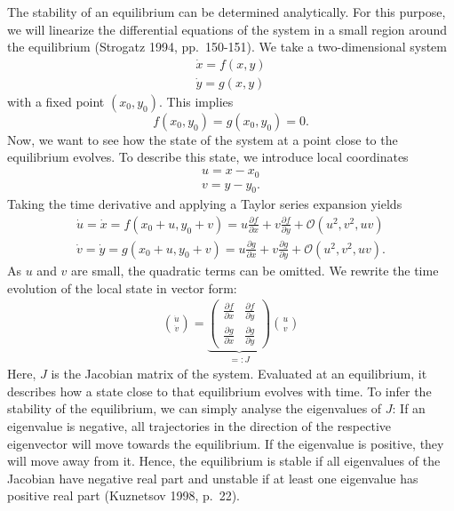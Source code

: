 \documentclass[12pt,a4paper,]{report}
\begin{document}
The stability of an equilibrium can be determined analytically. For this
purpose, we will linearize the differential equations of the system in a
small region around the equilibrium (Strogatz 1994, pp.~150-151). We
take a two-dimensional system
%
\begin{equation}
\label{stability-system}
\begin{split}
\dot{x} = f(x, y) \\
\dot{y} = g(x, y)
\end{split}
\end{equation}
%
 with a fixed point $(x_0, y_0)$. This implies
%
\begin{equation}
\label{stability-implication}
f(x_0, y_0) = g(x_0, y_0) = 0.
\end{equation}
%
 Now, we want to see how the state of the system at a point close to the
equilibrium evolves. To describe this state, we introduce local
coordinates
%
\begin{equation}
\label{stability-linearization}
\begin{split}
u = x - x_0 \\
v = y - y_0.
\end{split}
\end{equation}
%
 Taking the time derivative and applying a Taylor series expansion
yields
%
\begin{equation}
\label{stability-taylor}
\begin{split}
\dot{u} = \dot{x} = f(x_0 + u, y_0 + v) = u \frac{\partial f}{\partial x} + v \frac{\partial f}{\partial y} + \mathcal{O}(u^2, v^2, uv) \\
\dot{v} = \dot{y} = g(x_0 + u, y_0 + v) = u \frac{\partial g}{\partial x} + v \frac{\partial g}{\partial y} + \mathcal{O}(u^2, v^2, uv).
\end{split}
\end{equation}
%
 As $u$ and $v$ are small, the quadratic terms can be omitted. We
rewrite the time evolution of the local state in vector form:
%
\begin{equation}
\label{stability-vector}
\begin{aligned}
\binom{\dot{u}}{\dot{v}} = \underbrace{
\begin{pmatrix}
\frac{\partial f}{\partial x}&\frac{\partial f}{\partial y} \\
\frac{\partial g}{\partial x}&\frac{\partial g}{\partial y} 
\end{pmatrix}
}_{=: J} \binom{u}{v}
\end{aligned}
\end{equation}
%
 Here, $J$ is the Jacobian matrix of the system. Evaluated at an
equilibrium, it describes how a state close to that equilibrium evolves
with time. To infer the stability of the equilibrium, we can simply
analyse the eigenvalues of $J$: If an eigenvalue is negative, all
trajectories in the direction of the respective eigenvector will move
towards the equilibrium. If the eigenvalue is positive, they will move
away from it. Hence, the equilibrium is stable if all eigenvalues of the
Jacobian have negative real part and unstable if at least one eigenvalue
has positive real part (Kuznetsov 1998, p.~22).
\end{document}
